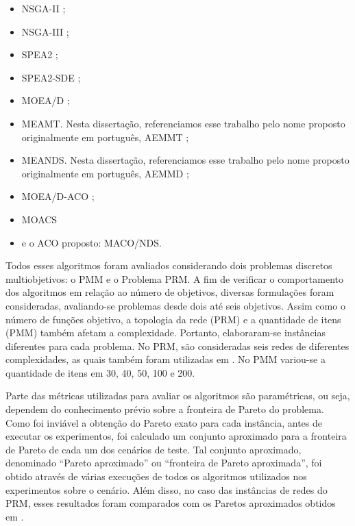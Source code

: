 \acresetall
\begin{itemize}
	\item \ac{NSGA-II} \cite{Deb2002};
	\item \ac{NSGA-III} \cite{Deb2014};
	\item \ac{SPEA2} \cite{Zitzler2002};
	\item \ac{SPEA2-SDE} \cite{Spea2SDE};
	\item \ac{MOEA/D} \cite{Zhang2007};
	\item \ac{MEAMT}. Nesta dissertação, referenciamos esse trabalho pelo nome proposto originalmente em português, \ac{AEMMT} \cite{Brasil2013};
	\item \ac{MEANDS}. Nesta dissertação, referenciamos esse trabalho pelo nome proposto originalmente em português, \ac{AEMMD} \cite{Lafeta2017};
	\item \ac{MOEA/D-ACO} \cite{Ke2013};
	\item \ac{MOACS} \cite{Riveros2016}
	\item e o ACO proposto: \ac{MACO/NDS}.
\end{itemize}

Todos esses algoritmos foram avaliados considerando dois problemas discretos multiobjetivos: o \ac{PMM} e o Problema \ac{PRM}. A fim  de verificar o comportamento dos algoritmos em relação ao número de objetivos, diversas formulações foram consideradas, avaliando-se problemas desde dois até seis objetivos. Assim como o número de funções objetivo, a topologia da rede (PRM) e a quantidade de itens (PMM) também afetam a complexidade. Portanto, elaboraram-se instâncias diferentes para cada problema. No PRM, são consideradas seis redes de diferentes complexidades, as quais também foram utilizadas em \cite{LafetaThesis}. No PMM variou-se a quantidade de itens em 30, 40, 50, 100 e 200.

Parte das métricas utilizadas para avaliar os algoritmos são paramétricas, ou seja, dependem do conhecimento prévio sobre a fronteira de Pareto do problema. Como foi inviável a obtenção do Pareto exato para cada instância, antes de executar os experimentos, foi calculado um conjunto aproximado para a fronteira de Pareto de cada um dos cenários de teste. Tal conjunto aproximado, denominado ``Pareto aproximado'' ou ``fronteira de Pareto aproximada'', foi obtido através de várias execuções de todos os algoritmos utilizados nos experimentos sobre o cenário. Além disso, no caso das instâncias de redes do PRM, esses resultados foram comparados com os Paretos aproximados obtidos em \cite{Lafeta2017}.

